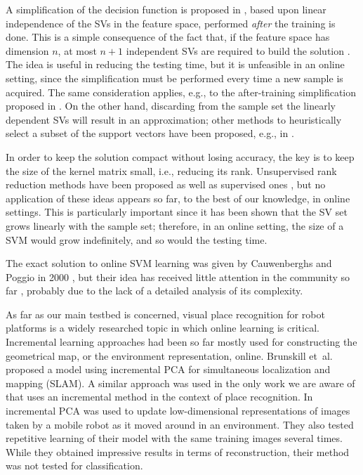 A simplification of the decision function is proposed in
\cite{DownsGM01}, based upon linear independence of the SVs in the
feature space, performed \emph{after} the training is done. This is a
simple consequence of the fact that, if the feature space has
dimension $n$, at most $n+1$ independent SVs are required to build the
solution \cite{PontilV98}. The idea is useful in reducing the testing
time, but it is unfeasible in an online setting, since the
simplification must be performed every time a new sample is
acquired. The same consideration applies, e.g., to the after-training
simplification proposed in \cite{nguyen2005}. On the other hand,
discarding from the sample set the linearly dependent SVs will result
in an approximation; other methods to heuristically select a subset of
the support vectors have been proposed, e.g., in
\cite{LeeM01,schoel06,KeerthiCDC06}.

In order to keep the solution compact without losing accuracy, the key
is to keep the size of the kernel matrix small, i.e., reducing its
rank. Unsupervised rank reduction methods have been proposed
\cite{Baudat03} as well as supervised ones \cite{BachJordan2005}, but
no application of these ideas appears so far, to the best of our
knowledge, in online settings. This is particularly important since it
has been shown \cite{Steinwart03} that the SV set grows linearly with
the sample set; therefore, in an online setting, the size of a SVM
would grow indefinitely, and so would the testing time.

The exact solution to online SVM learning was given by Cauwenberghs
and Poggio in 2000 \cite{CauwenberghsP00}, but their idea has received
little attention in the community so far \cite{Laskov2006}, probably
due to the lack of a detailed analysis of its complexity.

As far as our main testbed is concerned, visual place recognition for
robot platforms is a widely researched topic in which online learning
is critical. Incremental learning approaches had been so far mostly
used for constructing the geometrical map, or the environment
representation, online.  Brunskill et~al. \cite{emma:irca05} proposed
a model using incremental PCA for simultaneous localization and
mapping (SLAM). A similar approach was used in the only work we are
aware of that uses an incremental method in the context of place
recognition. In \cite{ljubjiana:icra02} incremental PCA was used to
update low-dimensional representations of images taken by a mobile
robot as it moved around in an environment. They also tested
repetitive learning of their model with the same training images
several times. While they obtained impressive results in terms of
reconstruction, their method was not tested for classification.
